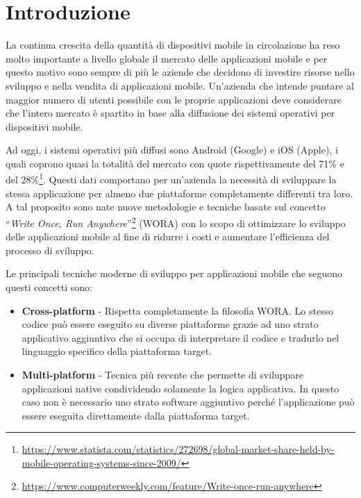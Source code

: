 
\section{Introduzione}
La continua crescita della quantità di dispositivi mobile in circolazione ha reso molto importante a livello globale il mercato delle applicazioni mobile e per questo motivo sono sempre di più le aziende che decidono di investire risorse nello sviluppo e nella vendita di applicazioni mobile. 
Un'azienda che intende puntare al maggior numero di utenti possibile con le proprie applicazioni deve considerare che l'intero mercato è spartito in base alla diffusione dei sistemi operativi per dispositivi mobile. 

Ad oggi, 
i sistemi operativi più diffusi sono Android (Google) e iOS (Apple), 
i quali coprono quasi la totalità del mercato con quote rispettivamente del 71\% e del 28\%\footnote{\href{https://www.statista.com/statistics/272698/global-market-share-held-by-mobile-operating-systems-since-2009/}{https://www.statista.com/statistics/272698/global-market-share-held-by-mobile-operating-systems-since-2009/}}.
Questi dati comportano per un'azienda la necessità di sviluppare la stessa applicazione per almeno due piattaforme completamente differenti tra loro. 
A tal proposito sono nate nuove metodologie e tecniche basate sul concetto ``\textit{Write Once, Run Anywhere}''\footnote{\href{https://www.computerweekly.com/feature/Write-once-run-anywhere}{https://www.computerweekly.com/feature/Write-once-run-anywhere}} (WORA) con lo scopo di ottimizzare lo sviluppo delle applicazioni mobile al fine di ridurre i costi e aumentare l'efficienza del processo di sviluppo.

Le principali tecniche moderne di sviluppo per applicazioni mobile che seguono questi concetti sono:
\begin{itemize}
    \item \textbf{Cross-platform} - Rispetta completamente la filosofia WORA. Lo stesso codice può essere eseguito su diverse piattaforme grazie ad uno strato applicativo aggiuntivo che si occupa di interpretare il codice e tradurlo nel linguaggio specifico della piattaforma target.
    
    \item \textbf{Multi-platform} - Tecnica più recente che permette di sviluppare applicazioni native condividendo solamente la logica applicativa. In questo caso non è necessario uno strato software aggiuntivo perché l'applicazione può essere eseguita direttamente dalla piattaforma target.
\end{itemize}

